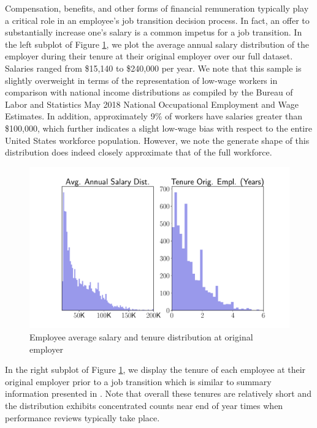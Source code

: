 \documentclass[10pt]{article}
\begin{document}
Compensation, benefits, and other forms of financial remuneration typically play 
a critical role in an employee's job transition decision process.  In fact, an offer to 
substantially increase one's salary is a common impetus for a job transition. 
In the left subplot of Figure \ref{fig:avgsal}, we plot the average 
annual salary distribution 
of the employer during their tenure at their original employer over our full dataset.  
Salaries ranged from \$15,140 to \$240,000 per year.  We note that this sample 
is slightly overweight in terms of the representation of low-wage workers 
in comparison with national income distributions as compiled 
by the Bureau of Labor and Statistics May 2018 National Occupational 
Employment and Wage Estimates. In addition, 
approximately 9\% of workers have salaries greater than \$100,000, which further 
indicates a slight low-wage bias with respect to the entire United States workforce population. 
However, we note the generate shape of this distribution does indeed closely approximate 
that of the full workforce.
%
\begin{figure}[thb]
    \centering
	\includegraphics[width=1.0\linewidth]{avgsal.pdf}
	\caption{Employee average salary and tenure distribution at original employer}
	\label{fig:avgsal}
\end{figure}
%
In the right subplot of Figure \ref{fig:avgsal}, we display the tenure of each 
employee at their original employer prior to a job transition which is similar to
summary information presented in \cite{Smart2016}. Note that overall these tenures 
are relatively short and the distribution exhibits concentrated counts near end of year 
times when performance reviews typically take place.  
\end{document}
